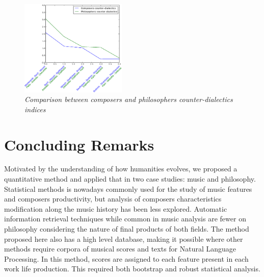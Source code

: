 \documentclass[
 aip,
 jmp,
 amsmath,amssymb,
 reprint,
]{revtex4-1}
\begin{document}
\begin{figure}[ht]
        \begin{center}
                \includegraphics[width=0.45\textwidth]{compara_dialeticas2}
        \end{center}
        \caption{\it Comparison between composers and philosophers
          counter-dialectics indices}
        \label{fig:comparingdialectics}
\end{figure}

\section{Concluding Remarks}

Motivated by the understanding of how humanities evolves, we proposed a quantitative method and applied that in two case studies: music and philosophy. Statistical
methods is nowadays commonly used for the study of music features and
composers productivity, but analysis of
composers characteristics modification along the music history has been less
explored. Automatic information retrieval techniques while common in music analysis are fewer on philosophy considering the nature of final products of both fields. 
The method proposed here also has a high level database,
making it possible where other methods require corpora of musical scores and texts
for Natural Language Processing. In this method,
scores are assigned to each feature present in each work life production. This
required both bootstrap and robust statistical analysis.

\end{document}

